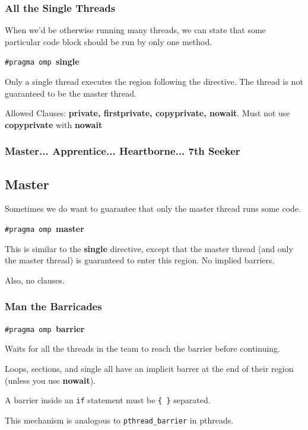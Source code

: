 \begin{frame}
\frametitle{All the Single Threads}

When we'd be otherwise running many threads, we can state
that some particular code block should be run by only one method.

  \begin{center}
    {\tt \#pragma omp }{\bf single}
  \end{center}
    Only a single thread executes the region following the directive.
    The thread is not guaranteed to be the master thread.

  Allowed Clauses: {\bf private, firstprivate, copyprivate, nowait}.
 Must not use {\bf copyprivate} with {\bf nowait}



\end{frame}


\begin{frame}
\frametitle{Master... Apprentice... Heartborne... 7th Seeker}

  \subsection*{Master} Sometimes we do want to guarantee that only the master
thread runs some code.
  \begin{center}
    {\tt \#pragma omp }{\bf master}
  \end{center}

    This is similar to the {\bf single} directive, except that the master thread (and only the master thread) is guaranteed to enter this region.
    No implied barriers. 

Also, no clauses.

\end{frame}


\begin{frame}
\frametitle{Man the Barricades}


  \begin{center}
    {\tt \#pragma omp }{\bf barrier}
  \end{center}

     Waits for all the threads in the team to reach the barrier before
      continuing.
      
     Loops, sections, and single all have an implicit barrer at the end of their
      region (unless you use {\bf nowait}).
      
      
     A barrier inside an {\tt if} statement must be {\tt \{  \}} separated.

     This mechanism is analogous to {\tt pthread\_barrier} in pthreads.


\end{frame}


